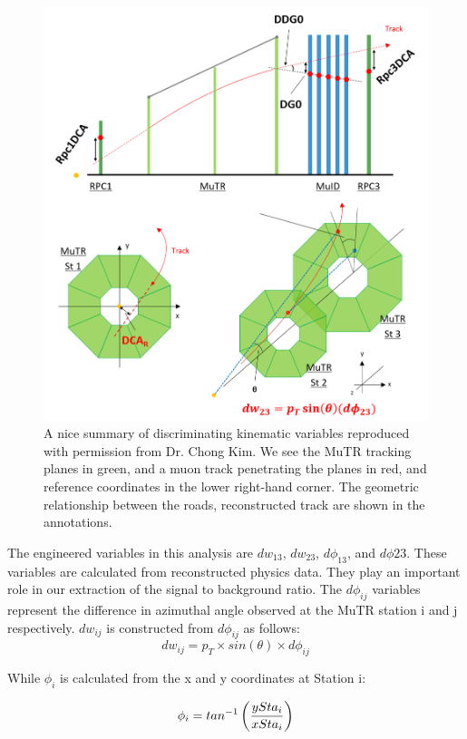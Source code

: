 \begin{figure}
  \centering
  \includegraphics[width=0.8\linewidth]{./figures/kinematic_variables_schematic.png}
  \caption{
    A nice summary of discriminating kinematic variables reproduced with
    permission from Dr. Chong Kim. We see the MuTR tracking planes in green, and
    a muon track penetrating the planes in red, and reference coordinates in the
    lower right-hand corner. The geometric relationship between the roads,
    reconstructed track are shown in the annotations.
  }

\end{figure}

The engineered variables in this analysis are $dw_{13}$, $dw_{23}$,
$d\phi_{13}$, and $d\phi{23}$.  These variables are calculated from
reconstructed physics data. They play an important role in our extraction of the
signal to background ratio.  The $d\phi_{ij}$ variables represent the difference
in azimuthal angle observed at the MuTR station i and j respectively.  $dw_{ij}$
is constructed from $d\phi_{ij}$ as follows:
\begin{equation}
  dw_{ij} = p_T \times sin(\theta) \times d\phi_{ij}
  \label{eq:dw23_definition}
\end{equation}

While $\phi_{i}$ is calculated from the x and y coordinates at Station i:

\begin{equation}
  \phi_i = tan^{-1}\left({ySta_i \over xSta_i}\right)
  \label{eq:phi_definition}
\end{equation}

